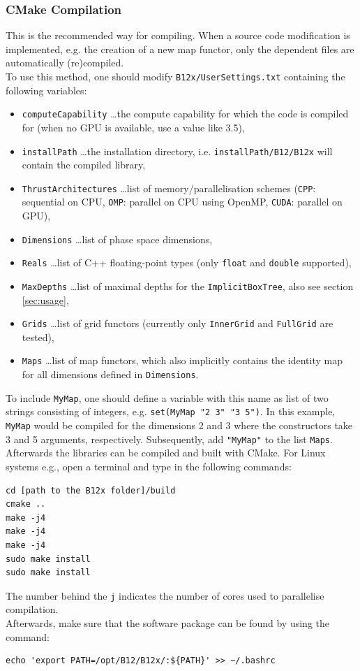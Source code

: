 \documentclass[a4paper,10pt,fleqn]{article}
\begin{document}
\subsubsection{CMake Compilation} \label{subsubsec:cmake_compilation}

This is the recommended way for compiling. When a source code modification is implemented, e.g. the creation of a new map functor, only the dependent files are automatically (re)compiled.\\
To use this method, one should modify \verb$B12x/UserSettings.txt$ containing the following variables:
\begin{itemize}
\item[] \verb$computeCapability$ \; \ldots the compute capability for which the code is compiled for (when no GPU is available, use a value like 3.5),
\item[] \verb$installPath$ \; \ldots the installation directory, i.e. \verb$installPath/B12/B12x$ will contain the compiled library,
\item[] \verb$ThrustArchitectures$ \; \ldots list of memory/parallelisation schemes (\verb$CPP$: sequential on CPU, \verb$OMP$: parallel on CPU using OpenMP, \verb$CUDA$: parallel on GPU),
\item[] \verb$Dimensions$ \; \ldots list of phase space dimensions,
\item[] \verb$Reals$ \; \ldots list of C++ floating-point types (only \verb$float$ and \verb$double$ supported),
\item[] \verb$MaxDepths$ \; \ldots list of maximal depths for the \verb$ImplicitBoxTree$, also see section \ref{sec:usage},
\item[] \verb$Grids$ \; \ldots list of grid functors (currently only \verb$InnerGrid$ and \verb$FullGrid$ are tested),
\item[] \verb$Maps$ \; \ldots list of map functors, which also implicitly contains the identity map for all dimensions defined in \verb$Dimensions$.
\end{itemize}
To include \verb$MyMap$, one should define a variable with this name as list of two strings consisting of integers, e.g. \verb$set(MyMap "2 3" "3 5")$. In this example, \verb$MyMap$ would be compiled for the dimensions 2 and 3 where the constructors take 3 and 5 arguments, respectively. Subsequently, add \verb$"MyMap"$ to the list \verb$Maps$.\\
Afterwards the libraries can be compiled and built with CMake. For Linux systems e.g., open a terminal and type in the following commands:
\begin{verbatim}
cd [path to the B12x folder]/build
cmake ..
make -j4
make -j4
make -j4
sudo make install
sudo make install
\end{verbatim}
The number behind the \verb$j$ indicates the number of cores used to parallelise compilation.\\
Afterwards, make sure that the software package can be found by using the command:
\begin{verbatim}
echo 'export PATH=/opt/B12/B12x/:${PATH}' >> ~/.bashrc
\end{verbatim}
\end{document}
